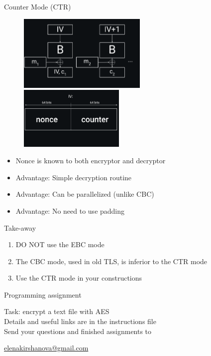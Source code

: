 \documentclass[usenames,dvipsnames, 9pt]{beamer}
\begin{document}
\begin{frame}{Counter Mode (CTR)}
\begin{figure}
	\includegraphics[width=0.55\textwidth]{CTR}
		\includegraphics[width=0.45\textwidth]{ShapeOfIV}
\end{figure}
\Large
\begin{itemize}
	\item Nonce is known to both encryptor and decryptor 
	\item Advantage: Simple decryption routine
	\item Advantage: Can be parallelized (unlike CBC)
	\item Advantage: No need to use padding
\end{itemize}

\end{frame}


\begin{frame}{Take-away}

\LARGE

\begin{enumerate}
	\itemsep 2em
	\item {\color{Orange} DO NOT} use the EBC mode 
	\item  The CBC mode, used in old TLS, {\color{Orange} is inferior to} the CTR mode
	\item Use the CTR mode in your constructions
	
\end{enumerate}
\end{frame}

\begin{frame}{Programming assignment}

\Large

{\color{Orange} Task:} encrypt a text file with AES  \\[10pt]

Details and useful links are in the instructions file\\[10pt]

Send your questions and finished assignments to \\[10pt]

\centering

\url{elenakirshanova@gmail.com}



\end{frame}
\end{document}
